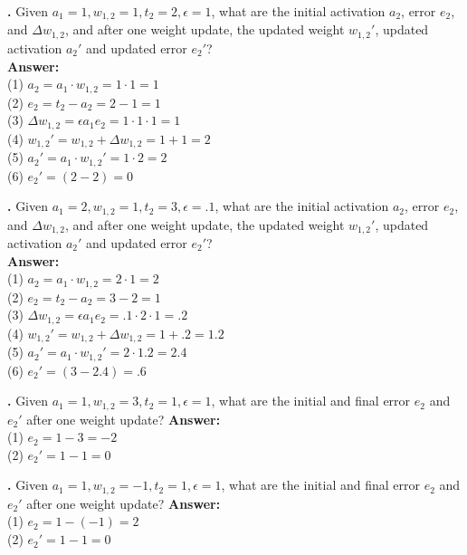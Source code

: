 


\noindent
{}
{\bf \theLMSCounter.}  Given $a_1 = 1, w_{1,2} = 1, t_2 = 2,\epsilon = 1$, what are the initial activation $a_2$, error $e_2$, and $\Delta w_{1,2}$, and after one weight update, the updated weight $w_{1,2}'$, updated activation  $a_2'$ and updated error $e_2'$? \\
{\bf Answer:}  \\
(1) $a_2 = a_1 \cdot w_{1,2} = 1 \cdot 1 = 1$ \\
(2) $e_2 = t_2 - a_2 = 2 - 1 = 1 $ \\
(3) $\Delta w_{1,2} = \epsilon a_1 e_2 = 1 \cdot 1 \cdot 1 = 1$ \\
(4) $w_{1,2}' = w_{1,2} + \Delta w_{1,2}  = 1 + 1 = 2$\\
(5) $a_2' =  a_1 \cdot w_{1,2}' = 1 \cdot 2 = 2$\\
(6) $e_2' = (2-2) = 0$
\bigskip

\noindent
{}
{\bf \theLMSCounter.}  Given $a_1 = 2, w_{1,2} = 1, t_2 = 3 ,\epsilon = .1$, what are the initial activation $a_2$, error $e_2$, and $\Delta w_{1,2}$, and after one weight update, the updated weight $w_{1,2}'$, updated activation  $a_2'$ and updated error $e_2'$? \\
{\bf Answer:}  \\
(1) $a_2 = a_1 \cdot w_{1,2} = 2 \cdot 1 = 2$ \\
(2) $e_2 = t_2 - a_2 = 3 - 2 = 1 $ \\
(3) $\Delta w_{1,2} = \epsilon a_1 e_2 = .1 \cdot 2 \cdot 1 = .2$ \\
(4) $w_{1,2}' = w_{1,2} + \Delta w_{1,2}  = 1 + .2 = 1.2$\\
(5) $a_2' =  a_1 \cdot w_{1,2}' = 2 \cdot 1.2 = 2.4$\\
(6) $e_2' = (3 - 2.4) = .6$
\bigskip

\noindent
{}
{\bf \theLMSCounter.}  Given $a_1 = 1, w_{1,2} = 3, t_2 = 1 ,\epsilon = 1$, what are the initial and final error $e_2$ and $e_2'$ after one weight update? 
{\bf Answer:}  \\
(1) $e_2 =  1 - 3  = -2 $ \\
(2) $e_2' = 1 - 1 = 0$
\bigskip

\noindent
{}
{\bf \theLMSCounter.}  Given $a_1 = 1, w_{1,2} = -1, t_2 = 1 ,\epsilon = 1$, what are the initial and final error $e_2$ and $e_2'$ after one weight update? 
{\bf Answer:}  \\
(1) $e_2 =  1 - (-1)  = 2 $ \\
(2) $e_2' = 1 - 1 = 0$
\bigskip


